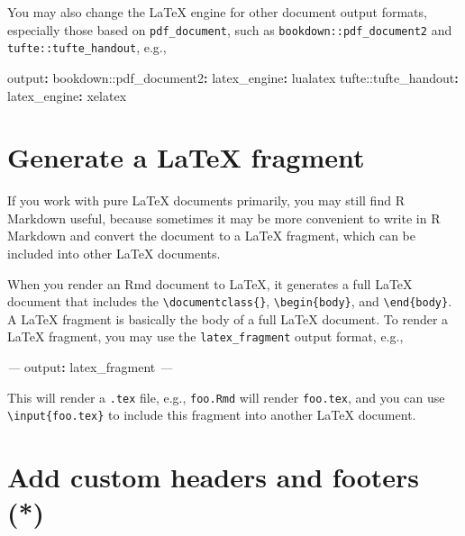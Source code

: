 \documentclass[
  11pt,
]{krantz}
\newenvironment{Shaded}{\begin{snugshade}}{\end{snugshade}}
\newcommand{\AttributeTok}[1]{\textcolor[rgb]{0.61,0.61,0.61}{#1}}
\newcommand{\FunctionTok}[1]{\textcolor[rgb]{0,0,0}{#1}}
\newcommand{\KeywordTok}[1]{\textcolor[rgb]{0.27,0.27,0.27}{\textbf{#1}}}
\newcommand{\PreprocessorTok}[1]{\textcolor[rgb]{0.37,0.37,0.37}{\textit{#1}}}
\begin{document}
You may also change the LaTeX engine for other document output formats, especially those based on \texttt{pdf\_document}, such as \texttt{bookdown::pdf\_document2} and \texttt{tufte::tufte\_handout}, e.g.,

\begin{Shaded}
\begin{Highlighting}[]
\FunctionTok{output}\KeywordTok{:}
\AttributeTok{  bookdown:}\FunctionTok{:pdf_document2}\KeywordTok{:}
\AttributeTok{    }\FunctionTok{latex_engine}\KeywordTok{:}\AttributeTok{ lualatex}
\AttributeTok{  tufte:}\FunctionTok{:tufte_handout}\KeywordTok{:}
\AttributeTok{    }\FunctionTok{latex_engine}\KeywordTok{:}\AttributeTok{ xelatex}
\end{Highlighting}
\end{Shaded}

\hypertarget{latex-fragment}{%
\section{Generate a LaTeX fragment}\label{latex-fragment}}

If you work with pure LaTeX documents primarily, you may still find R Markdown useful, because sometimes it may be more convenient to write in R Markdown and convert the document to a LaTeX fragment, which can be included into other LaTeX documents.

When you render an Rmd document to LaTeX, it generates a full LaTeX document that includes the \texttt{\textbackslash{}documentclass\{\}}, \texttt{\textbackslash{}begin\{body\}}, and \texttt{\textbackslash{}end\{body\}}. A LaTeX fragment is basically the body of a full LaTeX document. To render a LaTeX fragment, you may use the \texttt{latex\_fragment} output format, e.g.,

\begin{Shaded}
\begin{Highlighting}[]
\PreprocessorTok{---}
\FunctionTok{output}\KeywordTok{:}\AttributeTok{ latex_fragment}
\PreprocessorTok{---}
\end{Highlighting}
\end{Shaded}

This will render a \texttt{.tex} file, e.g., \texttt{foo.Rmd} will render \texttt{foo.tex}, and you can use \texttt{\textbackslash{}input\{foo.tex\}} to include this fragment into another LaTeX document.

\hypertarget{latex-header}{%
\section{Add custom headers and footers (*)}\label{latex-header}}
\end{document}
